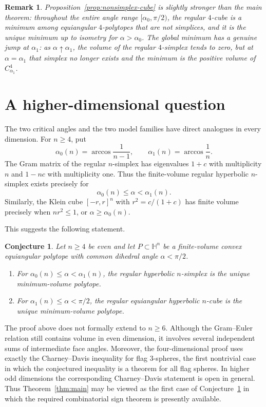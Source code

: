 \documentclass[12pt,a4paper]{article}
\theoremstyle{thmstyleone}
\newtheorem{conjecture}[theorem]{Conjecture}
\theoremstyle{thmstylethree}
\theoremstyle{thmstyletwo}
\newtheorem{remark}[theorem]{Remark}
\newcommand{\HH}{\mathbb H}
\begin{document}
\begin{remark}\label{rem:stronger-form}
Proposition~\ref{prop:nonsimplex-cube} is slightly stronger than the main
theorem: throughout the entire angle range
$[\alpha_0,\pi/2)$, the regular $4$-cube is a minimum among equiangular
$4$-polytopes that are not simplices, and it is the unique minimum up to
isometry for $\alpha>\alpha_0$.  The global minimum has a genuine jump at
$\alpha_1$: as $\alpha\uparrow\alpha_1$, the volume of the regular
$4$-simplex tends to zero, but at $\alpha=\alpha_1$ that simplex no longer
exists and the minimum is the positive volume of $C^4_{\alpha_1}$.
\end{remark}

\section{A higher-dimensional question}\label{sec:higher}

The two critical angles and the two model families have direct analogues in
every dimension.  For $n\geq4$, put
\[
 \alpha_0(n)=\arccos\frac1{n-1},
 \qquad
 \alpha_1(n)=\arccos\frac1n.
\]
The Gram matrix of the regular $n$-simplex has eigenvalues $1+c$ with
multiplicity $n$ and $1-nc$ with multiplicity one.  Thus the finite-volume
regular hyperbolic $n$-simplex exists precisely for
\[
 \alpha_0(n)\leq\alpha<\alpha_1(n).
\]
Similarly, the Klein cube $[-r,r]^n$ with
$r^2=c/(1+c)$ has finite volume precisely when
$nr^2\leq1$, or $\alpha\geq\alpha_0(n)$.

This suggests the following statement.

\begin{conjecture}\label{conj:higher}
Let $n\geq4$ be even and let $P\subset\HH^n$ be a finite-volume convex
equiangular polytope with common dihedral angle $\alpha<\pi/2$.
\begin{enumerate}
\item For $\alpha_0(n)\leq\alpha<\alpha_1(n)$, the regular hyperbolic
$n$-simplex is the unique minimum-volume polytope.
\item For $\alpha_1(n)\leq\alpha<\pi/2$, the regular equiangular hyperbolic
$n$-cube is the unique minimum-volume polytope.
\end{enumerate}
\end{conjecture}

The proof above does not formally extend to $n\geq6$.  Although the
Gram--Euler relation still contains volume in even dimension, it involves
several independent sums of intermediate face angles.  Moreover, the
four-dimensional proof uses exactly the Charney--Davis inequality for flag
$3$-spheres, the first nontrivial case in which the conjectured inequality is
a theorem for all flag spheres.  In higher odd dimensions the corresponding
Charney--Davis statement is open in general.  Thus Theorem~\ref{thm:main}
may be viewed as the first case of Conjecture~\ref{conj:higher} in which the
required combinatorial sign theorem is presently available.
\end{document}

